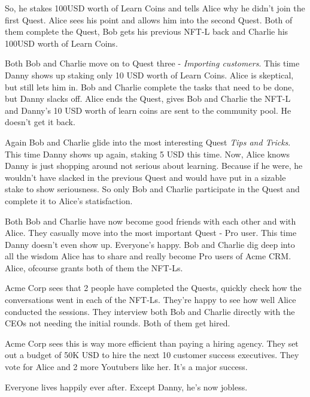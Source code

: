 \documentclass{article}
\begin{document}
    So, he stakes 100USD worth of Learn Coins and tells Alice why he didn't join the first Quest. Alice sees his point and allows him into the second Quest. 
    Both of them complete the Quest, Bob gets his previous NFT-L back and Charlie his 100USD worth of Learn Coins.
    \par
    Both Bob and Charlie move on to Quest three - \textit{Importing customers}. This time Danny shows up staking only 10 USD worth of Learn Coins. Alice is skeptical, but still lets him in.
    Bob and Charlie complete the tasks that need to be done, but Danny slacks off. Alice ends the Quest, gives Bob and Charlie the NFT-L and Danny's 10 USD worth of learn coins are sent to the community pool. He doesn't get it back. 
    \par
    Again Bob and Charlie glide into the most interesting Quest \textit{Tips and Tricks}. This time Danny shows up again, staking 5 USD this time. 
    Now, Alice knows Danny is just shopping around not serious about learning. Because if he were, he wouldn't have slacked in the previous Quest and would have put in a sizable stake to show seriousness.
    So only Bob and Charlie participate in the Quest and complete it to Alice's statisfaction. 
    \par 
    Both Bob and Charlie have now become good friends with each other and with Alice. They casually move into the most important Quest - Pro user. 
    This time Danny doesn't even show up. Everyone's happy. Bob and Charlie dig deep into all the wisdom Alice has to share and really become Pro users of Acme CRM. Alice, ofcourse grants both of them the NFT-Ls.
    \par
    Acme Corp sees that 2 people have completed the Quests, quickly check how the conversations went in each of the NFT-Ls. They're happy to see how well Alice conducted the sessions. 
    They interview both Bob and Charlie directly with the CEOs not needing the initial rounds. Both of them get hired.
    \par
    Acme Corp sees this is way more efficient than paying a hiring agency. They set out a budget of 50K USD to hire the next 10 customer success executives. They vote for Alice and 2 more Youtubers like her.
    It's a major success.
    \par
    Everyone lives happily ever after. Except Danny, he's now jobless.

      
        

      
\end{document}
